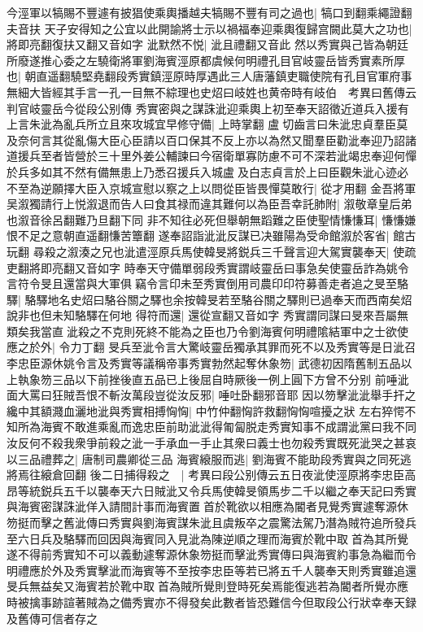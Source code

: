 今涇軍以犒賜不豐遽有披猖使乘輿播越夫犒賜不豐有司之過也|{
	犒口到翻乘繩證翻夫音扶}
天子安得知之公宜以此開諭將士示以禍福奉迎乘輿復歸宫闕此莫大之功也|{
	將即亮翻復扶又翻又音如字}
泚默然不悦|{
	泚且禮翻又音此}
然以秀實與己皆為朝廷所廢遂推心委之左驍衛將軍劉海賓涇原都虞候何明禮孔目官岐靈岳皆秀實素所厚也|{
	朝直遥翻驍堅堯翻段秀實鎮涇原時厚遇此三人唐藩鎮吏職使院有孔目官軍府事無細大皆經其手言一孔一目無不綜理也史炤曰岐姓也黄帝時有岐伯　考異曰舊傳云判官岐靈岳今從段公别傳}
秀實密與之謀誅泚迎乘輿上初至奉天詔徵近道兵入援有上言朱泚為亂兵所立且來攻城宜早修守備|{
	上時掌翻}
盧切齒言曰朱泚忠貞羣臣莫及奈何言其從亂傷大臣心臣請以百口保其不反上亦以為然又聞羣臣勸泚奉迎乃詔諸道援兵至者皆營於三十里外姜公輔諫曰今宿衛單寡防慮不可不深若泚竭忠奉迎何憚於兵多如其不然有備無患上乃悉召援兵入城盧及白志貞言於上曰臣觀朱泚心迹必不至為逆願擇大臣入京城宣慰以察之上以問從臣皆畏憚莫敢行|{
	從才用翻}
金吾將軍吴溆獨請行上悦溆退而告人曰食其禄而違其難何以為臣吾幸託肺附|{
	溆敬章皇后弟也溆音徐呂翻難乃旦翻下同}
非不知往必死但舉朝無蹈難之臣使聖情慊慊耳|{
	慊慊嫌恨不足之意朝直遥翻慊苦簟翻}
遂奉詔詣泚泚反謀已决雖陽為受命館溆於客省|{
	館古玩翻}
尋殺之溆湊之兄也泚遣涇原兵馬使韓旻將鋭兵三千聲言迎大駕實襲奉天|{
	使疏吏翻將即亮翻又音如字}
時奉天守備單弱段秀實謂岐靈岳曰事急矣使靈岳詐為姚令言符令旻且還當與大軍俱竊令言印未至秀實倒用司農印印符募善走者追之旻至駱驛|{
	駱驛地名史炤曰駱谷關之驛也余按韓旻若至駱谷關之驛則已過奉天而西南矣炤說非也但未知駱驛在何地}
得符而還|{
	還從宣翻又音如字}
秀實謂同謀曰旻來吾屬無類矣我當直泚殺之不克則死終不能為之臣也乃令劉海賓何明禮隂結軍中之士欲使應之於外|{
	令力丁翻}
旻兵至泚令言大驚岐靈岳獨承其罪而死不以及秀實等是日泚召李忠臣源休姚令言及秀實等議稱帝事秀實勃然起奪休象笏|{
	武德初因隋舊制五品以上執象笏三品以下前挫後直五品已上後屈自時厥後一例上圓下方曾不分别}
前唾泚面大罵曰狂賊吾恨不斬汝萬段豈從汝反邪|{
	唾吐卧翻邪音耶}
因以笏擊泚泚舉手扞之纔中其額濺血灑地泚與秀實相搏恟恟|{
	中竹仲翻恟許救翻恟恟喧擾之狀}
左右猝愕不知所為海賓不敢進乘亂而逸忠臣前助泚泚得匍匐脱走秀實知事不成謂泚黨曰我不同汝反何不殺我衆爭前殺之泚一手承血一手止其衆曰義士也勿殺秀實既死泚哭之甚哀以三品禮葬之|{
	唐制司農卿從三品}
海賓縗服而逃|{
	劉海賓不能助段秀實與之同死逃將焉往縗倉回翻}
後二日捕得殺之　|{
	考異曰段公别傳云五日夜泚使涇原將李忠臣高昂等統鋭兵五千以襲奉天六日賊泚又令兵馬使韓旻領馬步二千以繼之奉天記曰秀實與海賓密謀誅泚佯入請間計事而海賓置首於靴欲以相應為閽者見覺秀實遽奪源休笏挺而擊之舊泚傳曰秀實與劉海賓謀朱泚且虞叛卒之震驚法駕乃潛為賊符追所發兵至六日兵及駱驛而回因與海賓同入見泚為陳逆順之理而海賓於靴中取首為其所覺遂不得前秀實知不可以義動遽奪源休象笏挺而擊泚秀實傳曰與海賓約事急為繼而令明禮應於外及秀實擊泚而海賓等不至按李忠臣等若已將五千人襲奉天則秀實雖追還旻兵無益矣又海賓若於靴中取首為賊所覺則登時死矣焉能復逃若為閽者所覺亦應時被擒事跡諠著賊為之備秀實亦不得發矣此數者皆恐難信今但取段公行狀幸奉天録及舊傳可信者存之}
